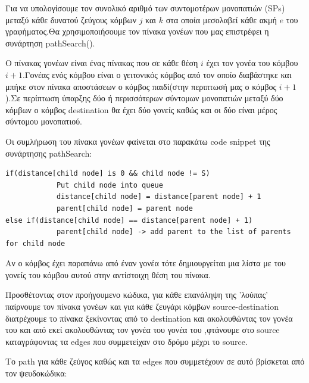 \documentclass{article}
\begin{document}
Για να υπολογίσουμε τον συνολικό αριθμό των συντομοτέρων μονοπατιών (SPs) μεταξύ κάθε δυνατού ζεύγους κόμβων $j$ και $k$ στα οποία μεσολαβεί κάθε ακμή $e$ του γραφήματος.Θα χρησιμοποιήσουμε τον πίνακα γονέων που μας επιστρέφει η συνάρτηση
pathSearch().\bigbreak

Ο πίνακας γονέων είναι ένας πίνακας που σε κάθε θέση $i$ έχει τον γονέα του κόμβου $i+1$.Γονέας ενός κόμβου είναι ο γειτονικός κόμβος από τον οποίο διαβάστηκε και μπήκε στον πίνακα αποστάσεων ο κόμβος παιδί(στην περιπτωσή μας ο κόμβος $i+1$).Σε περίπτωση ύπαρξης δύο ή περισσότερων σύντομων μονοπατιών μεταξύ δύο κόμβων ο κόμβος destination θα έχει δύο γονείς καθώς και οι δύο είναι μέρος σύντομου μονοπατιού.\bigbreak

Οι συμλήρωση του πίνακα γονέων φαίνεται στο παρακάτω code snippet της συνάρτησης pathSearch:

\begin{lstlisting}
if(distance[child node] is 0 && child node != S)
			Put child node into queue
			distance[child node] = distance[parent node] + 1
			parent[child node] = parent node
else if(distance[child node] == distance[parent node] + 1)
			parent[child node] -> add parent to the list of parents for child node
\end{lstlisting}\bigbreak
{}
\bigbreak
Αν ο κόμβος έχει παραπάνω από έναν γονέα τότε δημιουργείται μια λίστα με του γονείς του κόμβου αυτού στην αντίστοιχη θέση του πίνακα.\bigbreak

Προσθέτοντας στον προήγουμενο κώδικα, για κάθε επανάληψη της 'λούπας' παίρνουμε τον πίνακα γονέων και για κάθε ζευγάρι κόμβων source-destination διατρέχουμε το πίνακα ξεκίνοντας από το destination και ακολουθώντας τον γονέα του και από εκεί ακολουθώντας τον γονέα του γονέα του ,φτάνουμε στο source καταγράφοντας τα edges που συμμετείχαν στο δρόμο μέχρι το source.\pagebreak

Το path για κάθε ζεύγος καθώς και τα edges που συμμετέχουν σε αυτό βρίσκεται από τον ψευδοκώδικα:
\end{document}
